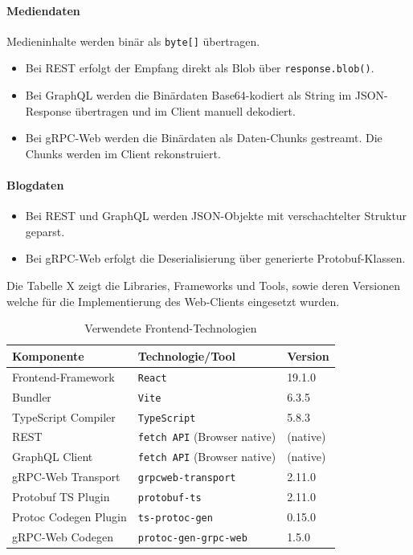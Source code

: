 \begin{enumerate}
	\paragraph{Mediendaten}
	Medieninhalte werden binär als \texttt{byte[]} übertragen.
	\begin{itemize}
		\item Bei REST erfolgt der Empfang direkt als Blob über \texttt{response.blob()}.
		\item Bei GraphQL werden die Binärdaten Base64-kodiert als String im JSON-Response übertragen und im Client manuell dekodiert.
		\item Bei gRPC-Web werden die Binärdaten als Daten-Chunks gestreamt. Die Chunks werden im Client rekonstruiert.
	\end{itemize}
	
	\paragraph{Blogdaten}
	\begin{itemize}
		\item Bei REST und GraphQL werden JSON-Objekte mit verschachtelter Struktur geparst.
		\item Bei gRPC-Web erfolgt die Deserialisierung über generierte Protobuf-Klassen.
	\end{itemize}
	
		Die Tabelle X zeigt die Libraries, Frameworks und Tools, sowie deren Versionen welche für die Implementierung des Web-Clients eingesetzt wurden.
	
	\begin{table}[h]
		\centering
		\caption{Verwendete Frontend-Technologien}
		\begin{tabular}{lll}
			\hline
			\textbf{Komponente} & \textbf{Technologie/Tool} & \textbf{Version} \\
			\hline
			Frontend-Framework & \texttt{React} & 19.1.0 \\
			Bundler & \texttt{Vite} & 6.3.5 \\
			TypeScript Compiler & \texttt{TypeScript} & 5.8.3 \\
			REST & \texttt{fetch API} (Browser native) & (native) \\
			GraphQL Client & \texttt{fetch API} (Browser native) & (native) \\
			gRPC-Web Transport & \texttt{grpcweb-transport} & 2.11.0 \\
			Protobuf TS Plugin & \texttt{protobuf-ts} & 2.11.0 \\
			Protoc Codegen Plugin & \texttt{ts-protoc-gen} & 0.15.0 \\
			gRPC-Web Codegen & \texttt{protoc-gen-grpc-web} & 1.5.0 \\
			\hline
		\end{tabular}
	\end{table}
	

\end{enumerate}
